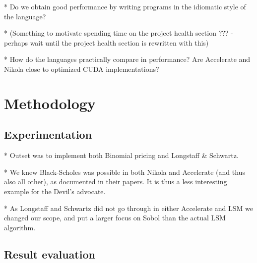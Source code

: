 * Do we obtain good performance by writing programs in the idiomatic
  style of the language?

* (Something to motivate spending time on the project health section
  ??? - perhaps wait until the project health section is rewritten
  with this)

* How do the languages practically compare in performance? Are
  Accelerate and Nikola close to optimized CUDA implementations?


\section{Methodology}
\subsection{Experimentation}

* Outset was to implement both Binomial pricing and Longstaff \&
Schwartz.

* We knew Black-Scholes was possible in both Nikola and Accelerate (and
thus also all other), as documented in their papers. It is thus a less
interesting example for the Devil's advocate.

* As Longstaff and Schwartz did not go through in either Accelerate
and LSM we changed our scope, and put a larger focus on Sobol than the
actual LSM algorithm.

\subsection{Result evaluation}




